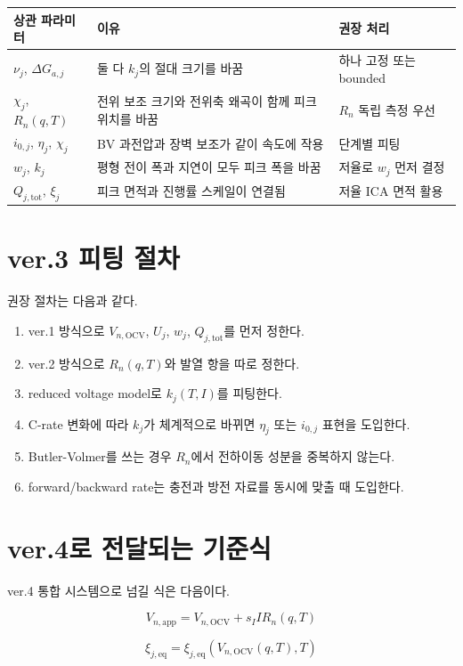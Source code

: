 \documentclass[11pt,a4paper]{article}
\newcommand{\OCV}{\mathrm{OCV}}
\newcommand{\app}{\mathrm{app}}
\newcommand{\eq}{\mathrm{eq}}
\newcommand{\tot}{\mathrm{tot}}
\begin{document}
\begin{longtable}{p{}p{}p{}}
\toprule
상관 파라미터 & 이유 & 권장 처리 \\
\midrule
\endhead
\(\nu_j\), \(\Delta G_{a,j}\) & 둘 다 \(k_j\)의 절대 크기를 바꿈 & 하나 고정 또는 bounded \\
\(\chi_j\), \(R_n(q,T)\) & 전위 보조 크기와 전위축 왜곡이 함께 피크 위치를 바꿈 & \(R_n\) 독립 측정 우선 \\
\(i_{0,j}\), \(\eta_j\), \(\chi_j\) & BV 과전압과 장벽 보조가 같이 속도에 작용 & 단계별 피팅 \\
\(w_j\), \(k_j\) & 평형 전이 폭과 지연이 모두 피크 폭을 바꿈 & 저율로 \(w_j\) 먼저 결정 \\
\(Q_{j,\tot}\), \(\xi_j\) & 피크 면적과 진행률 스케일이 연결됨 & 저율 ICA 면적 활용 \\
\bottomrule
\end{longtable}

\section{ver.3 피팅 절차}
권장 절차는 다음과 같다.
\begin{enumerate}[label=\arabic*)]
\item ver.1 방식으로 \(V_{n,\OCV}\), \(U_j\), \(w_j\), \(Q_{j,\tot}\)를 먼저 정한다.
\item ver.2 방식으로 \(R_n(q,T)\)와 발열 항을 따로 정한다.
\item reduced voltage model로 \(k_j(T,I)\)를 피팅한다.
\item C-rate 변화에 따라 \(k_j\)가 체계적으로 바뀌면 \(\eta_j\) 또는 \(i_{0,j}\) 표현을 도입한다.
\item Butler-Volmer를 쓰는 경우 \(R_n\)에서 전하이동 성분을 중복하지 않는다.
\item forward/backward rate는 충전과 방전 자료를 동시에 맞출 때 도입한다.
\end{enumerate}

\section{ver.4로 전달되는 기준식}
ver.4 통합 시스템으로 넘길 식은 다음이다.

\begin{equation}
V_{n,\app}=V_{n,\OCV}+s_IIR_n(q,T)
\end{equation}

\begin{equation}
\xi_{j,\eq}=\xi_{j,\eq}\!\left(V_{n,\OCV}(q,T),T\right)
\end{equation}
\end{document}
